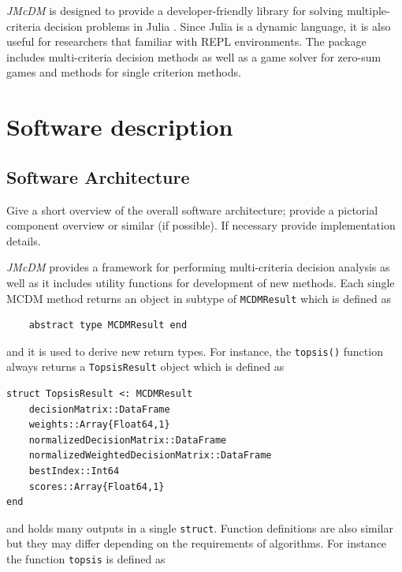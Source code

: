 \documentclass[authoryear,preprint,review,12pt]{elsarticle}
\begin{document}
\emph{JMcDM} is designed to provide a developer-friendly library for solving multiple-criteria decision problems in Julia \cite{julia}. Since Julia is a dynamic language, it is also useful for researchers that familiar with REPL environments. The package includes multi-criteria decision methods as well as a game solver for zero-sum games and methods for single criterion methods. 

\section{Software description}
\label{}






\subsection{Software Architecture}
\label{section:softwareArch}
{\color{red}Give a short overview of the overall software architecture; provide a pictorial component 
overview or similar (if possible). If necessary provide implementation details.}

\emph{JMcDM} provides a framework for performing multi-criteria decision analysis as well as it includes utility functions for development of new methods. Each single MCDM method returns an object in subtype of \texttt{MCDMResult} which is defined as 

\begin{verbatim}
	abstract type MCDMResult end
\end{verbatim}

\noindent and it is used to derive new return types. For instance, the \texttt{topsis()} function always returns a \texttt{TopsisResult} object which is defined as 

\begin{verbatim}
struct TopsisResult <: MCDMResult
    decisionMatrix::DataFrame
    weights::Array{Float64,1}
    normalizedDecisionMatrix::DataFrame
    normalizedWeightedDecisionMatrix::DataFrame 
    bestIndex::Int64 
    scores::Array{Float64,1}
end
\end{verbatim}

\noindent and holds many outputs in a single \texttt{struct}. Function definitions are also similar but they may differ depending on the requirements of algorithms. For instance the function \texttt{topsis} is defined as
\end{document}
